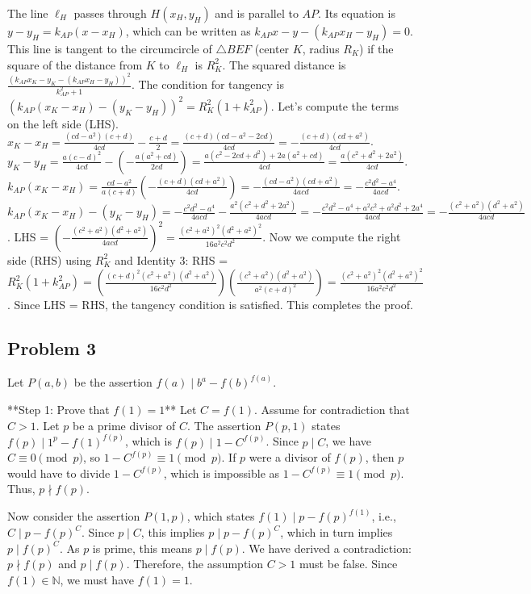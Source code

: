 \documentclass[12pt]{article}
\begin{document}
The line $\ell_H$ passes through $H(x_H, y_H)$ and is parallel to $AP$. Its equation is $y-y_H = k_{AP}(x-x_H)$, which can be written as $k_{AP}x - y - (k_{AP}x_H - y_H) = 0$.
This line is tangent to the circumcircle of $\triangle BEF$ (center $K$, radius $R_K$) if the square of the distance from $K$ to $\ell_H$ is $R_K^2$. The squared distance is $\frac{(k_{AP}x_K - y_K - (k_{AP}x_H - y_H))^2}{k_{AP}^2+1}$.
The condition for tangency is $(k_{AP}(x_K-x_H)-(y_K-y_H))^2 = R_K^2(1+k_{AP}^2)$.
Let's compute the terms on the left side (LHS).
$x_K-x_H = \frac{(cd-a^2)(c+d)}{4cd} - \frac{c+d}{2} = \frac{(c+d)(cd-a^2-2cd)}{4cd} = -\frac{(c+d)(cd+a^2)}{4cd}$.
$y_K-y_H = \frac{a(c-d)^2}{4cd} - \left(-\frac{a(a^2+cd)}{2cd}\right) = \frac{a(c^2-2cd+d^2)+2a(a^2+cd)}{4cd} = \frac{a(c^2+d^2+2a^2)}{4cd}$.
$k_{AP}(x_K-x_H) = \frac{cd-a^2}{a(c+d)} \left(-\frac{(c+d)(cd+a^2)}{4cd}\right) = -\frac{(cd-a^2)(cd+a^2)}{4acd} = -\frac{c^2d^2-a^4}{4acd}$.
$k_{AP}(x_K-x_H)-(y_K-y_H) = -\frac{c^2d^2-a^4}{4acd} - \frac{a^2(c^2+d^2+2a^2)}{4acd} = -\frac{c^2d^2-a^4+a^2c^2+a^2d^2+2a^4}{4acd} = -\frac{(c^2+a^2)(d^2+a^2)}{4acd}$.
LHS = $\left(-\frac{(c^2+a^2)(d^2+a^2)}{4acd}\right)^2 = \frac{(c^2+a^2)^2(d^2+a^2)^2}{16a^2c^2d^2}$.
Now we compute the right side (RHS) using $R_K^2$ and Identity 3:
RHS = $R_K^2(1+k_{AP}^2) = \left(\frac{(c+d)^2(c^2+a^2)(d^2+a^2)}{16c^2d^2}\right) \left(\frac{(c^2+a^2)(d^2+a^2)}{a^2(c+d)^2}\right) = \frac{(c^2+a^2)^2(d^2+a^2)^2}{16a^2c^2d^2}$.
Since LHS = RHS, the tangency condition is satisfied. This completes the proof.

\subsection{Problem 3}

Let $P(a, b)$ be the assertion $f(a) \mid b^a - f(b)^{f(a)}$.

**Step 1: Prove that $f(1)=1$**
Let $C=f(1)$. Assume for contradiction that $C>1$. Let $p$ be a prime divisor of $C$.
The assertion $P(p, 1)$ states $f(p) \mid 1^p - f(1)^{f(p)}$, which is $f(p) \mid 1 - C^{f(p)}$.
Since $p \mid C$, we have $C \equiv 0 \pmod p$, so $1 - C^{f(p)} \equiv 1 \pmod p$.
If $p$ were a divisor of $f(p)$, then $p$ would have to divide $1 - C^{f(p)}$, which is impossible as $1 - C^{f(p)} \equiv 1 \pmod p$. Thus, $p \nmid f(p)$.

Now consider the assertion $P(1, p)$, which states $f(1) \mid p - f(p)^{f(1)}$, i.e., $C \mid p - f(p)^C$.
Since $p \mid C$, this implies $p \mid p - f(p)^C$, which in turn implies $p \mid f(p)^C$.
As $p$ is prime, this means $p \mid f(p)$.
We have derived a contradiction: $p \nmid f(p)$ and $p \mid f(p)$.
Therefore, the assumption $C>1$ must be false. Since $f(1) \in \mathbb N$, we must have $f(1)=1$.
\end{document}
